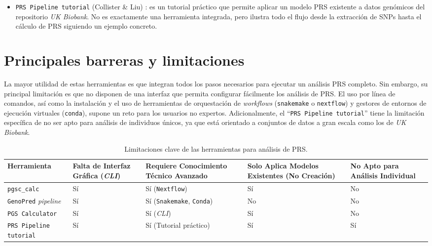 \begin{itemize}
    \item
    \texttt{PRS Pipeline tutorial} (Collister \& Liu) \cite{collister}: es un tutorial práctico que permite aplicar un modelo PRS existente a datos genómicos del repositorio \textit{UK Biobank}. No es exactamente una herramienta integrada, pero ilustra todo el flujo desde la extracción de SNPs hasta el cálculo de PRS siguiendo un ejemplo concreto. 
    
\end{itemize}

\section{Principales barreras y limitaciones}

La mayor utilidad de estas herramientas es que integran todos los pasos necesarios para ejecutar un análisis PRS completo. Sin embargo, su principal limitación es que no disponen de una interfaz que permita configurar fácilmente los análisis de PRS. El uso por línea de comandos, así como la instalación y el uso de herramientas de orquestación de \textit{workflows} (\texttt{snakemake} o \texttt{nextflow}) y gestores de entornos de ejecución virtuales (\texttt{conda}), supone un reto para los usuarios no expertos.  Adicionalmente, el ``\texttt{PRS Pipeline tutorial}'' tiene la limitación específica de no ser apto para análisis de individuos únicos, ya que está orientado a conjuntos de datos a gran escala como los de \textit{UK Biobank}. 

\begin{table}[H]
    \centering
    \small
    \label{tab:prs_tool_limitations}
    \begin{tabularx}{\textwidth}{ >{\raggedright\arraybackslash}X >{\centering\arraybackslash}X >{\centering\arraybackslash}X >{\centering\arraybackslash}X >{\centering\arraybackslash}X }
        \toprule
        \textbf{Herramienta} & \textbf{Falta de Interfaz Gráfica (\textit{CLI})} & \textbf{Requiere Conocimiento Técnico Avanzado} & \textbf{Solo Aplica Modelos Existentes (No Creación)} & \textbf{No Apto para Análisis Individual} \\
        \midrule
        \texttt{pgsc\_calc} & Sí & Sí (\texttt{Nextflow}) & Sí & No \\ \addlinespace
        \texttt{GenoPred} \textit{pipeline} & Sí & Sí (\texttt{Snakemake}, \texttt{Conda}) & No & No \\ \addlinespace
        \texttt{PGS Calculator} & Sí & Sí (\textit{CLI}) & Sí & No \\ \addlinespace
        \texttt{PRS Pipeline tutorial} & Sí & Sí (Tutorial práctico) & Sí & Sí \\
        \bottomrule
    \end{tabularx}
    \caption{Limitaciones clave de las herramientas para análisis de PRS.}
\end{table}

